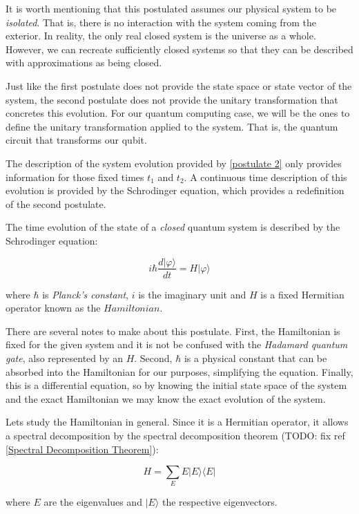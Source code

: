\documentclass{article}
\begin{document}
	It is worth mentioning that this postulated assumes our physical system to be \emph{isolated}. That is, there is no interaction with the system coming from the exterior. In reality, the only real closed system is the universe as a whole. However, we can recreate sufficiently closed systems so that they can be described with approximations as being closed. 
	
	Just like the first postulate does not provide the state space or state vector of the system, the second postulate does not provide the unitary transformation that concretes this evolution. For our quantum computing case, we will be the ones to define the unitary transformation applied to the system. That is, the quantum circuit that transforms our qubit.
	
	The description of the system evolution provided by \ref{postulate 2} only provides information for those fixed times $t_1$ and $t_2$. A continuous time description of this evolution is provided by the Schrodinger equation, which provides a redefinition of the second postulate.
	
	\begin{postulate}
		The time evolution of the state of a \emph{closed} quantum system is described by the Schrodinger equation:
		
		$$ i \hbar \frac{d|\varphi\rangle}{dt} = H|\varphi\rangle $$
		
		where $\hbar$ is \emph{Planck’s constant}, $i$ is the imaginary unit and $H$ is a fixed Hermitian operator known as the $Hamiltonian$.
	\end{postulate}
	
	There are several notes to make about this postulate. First, the Hamiltonian is fixed for the given system and it is not be confused with the \emph{Hadamard quantum gate}, also represented by an $H$. Second, $\hbar$ is a physical constant that can be absorbed into the Hamiltonian for our purposes, simplifying the equation. Finally, this is a differential equation, so by knowing the initial state space of the system and the exact Hamiltonian we may know the exact evolution of the system.
	
	
	Lets study the Hamiltonian in general. Since it is a Hermitian operator, it allows a spectral decomposition by the spectral decomposition theorem (TODO: fix ref \ref{Spectral Decomposition Theorem}):
	
	$$ H = \sum_E E |E\rangle\langle E| $$
	
	where $E$ are the eigenvalues and $|E\rangle$ the respective eigenvectors. 
	
\end{document}
